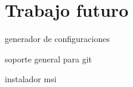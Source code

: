 \section{Trabajo futuro}
        
        
generador de configuraciones

soporte general para git

instalador msi

